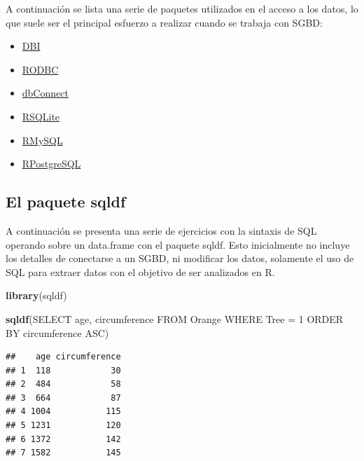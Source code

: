 \documentclass[
]{book}
\newenvironment{Shaded}{\begin{snugshade}}{\end{snugshade}}
\newcommand{\FunctionTok}[1]{\textcolor[rgb]{0.13,0.29,0.53}{\textbf{#1}}}
\newcommand{\NormalTok}[1]{#1}
\newcommand{\StringTok}[1]{\textcolor[rgb]{0.31,0.60,0.02}{#1}}
\providecommand{\tightlist}{%
  \setlength{\itemsep}{0pt}\setlength{\parskip}{0pt}}
\begin{document}
A continuación se lista una serie de paquetes utilizados en el acceso a los datos, lo que suele ser el principal esfuerzo a realizar cuando se trabaja con SGBD:

\begin{itemize}
\tightlist
\item
  \href{https://cran.r-project.org/web/packages/DBI/index.html}{DBI}
\item
  \href{https://cran.r-project.org/web/packages/RODBC/index.html}{RODBC}
\item
  \href{https://cran.r-project.org/web/packages/dbConnect/index.html}{dbConnect}
\item
  \href{https://cran.r-project.org/web/packages/RSQLite/index.html}{RSQLite}
\item
  \href{https://cran.r-project.org/web/packages/RMySQL/index.html}{RMySQL}
\item
  \href{https://cran.r-project.org/web/packages/RPostgreSQL/index.html}{RPostgreSQL}
\end{itemize}

\subsection{El paquete sqldf}\label{el-paquete-sqldf}

A continuación se presenta una serie de ejercicios con la sintaxis de SQL operando sobre un data.frame con el paquete sqldf. Esto inicialmente no incluye los detalles de conectarse a un SGBD, ni modificar los
datos, solamente el uso de SQL para extraer datos con el objetivo de ser analizados en R.

\begin{Shaded}
\begin{Highlighting}[]
\FunctionTok{library}\NormalTok{(sqldf)}
\end{Highlighting}
\end{Shaded}

\begin{Shaded}
\begin{Highlighting}[]
\FunctionTok{sqldf}\NormalTok{(}\StringTok{\textquotesingle{}SELECT age, circumference FROM Orange WHERE Tree = 1 ORDER BY circumference ASC\textquotesingle{}}\NormalTok{)}
\end{Highlighting}
\end{Shaded}

\begin{verbatim}
##    age circumference
## 1  118            30
## 2  484            58
## 3  664            87
## 4 1004           115
## 5 1231           120
## 6 1372           142
## 7 1582           145
\end{verbatim}
\end{document}
